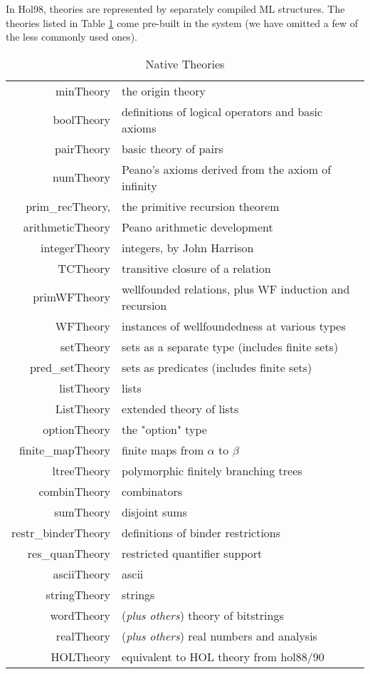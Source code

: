 In Hol98, theories are represented by separately compiled ML
structures. The theories listed in Table \ref{nativeTheories} come
pre-built in the system (we have omitted a few of the less commonly used
ones). 
\begin{table}
\begin{center}
\begin{tabular}{|r|l|} \hline
minTheory & the origin theory \\
boolTheory & definitions of logical operators and basic axioms \\
pairTheory & basic theory of pairs \\
numTheory & Peano's axioms derived from the axiom of infinity \\
prim\_recTheory, & the primitive recursion theorem \\
arithmeticTheory & Peano arithmetic development \\
integerTheory & integers, by John Harrison \\
TCTheory & transitive closure of a relation \\
primWFTheory & wellfounded relations, plus WF induction and recursion \\
WFTheory & instances of wellfoundedness at various types \\
setTheory & sets as a separate type (includes finite sets) \\
pred\_setTheory & sets as predicates (includes finite sets) \\
listTheory & lists  \\
ListTheory & extended theory of lists \\
optionTheory & the "option" type \\
finite\_mapTheory & finite maps from $\alpha$ to $\beta$ \\
ltreeTheory & polymorphic finitely branching trees \\
combinTheory & combinators \\
sumTheory & disjoint sums \\
restr\_binderTheory & definitions of binder restrictions \\
res\_quanTheory & restricted quantifier support \\
asciiTheory & ascii \\
stringTheory & strings \\
wordTheory & ({\it plus others}) theory of bitstrings \\
realTheory & ({\it plus others}) real numbers and analysis \\
HOLTheory & equivalent to HOL theory from hol88/90\\  \hline
\end{tabular}
\caption{Native Theories}\label{nativeTheories}
\end{center}
\end{table}

